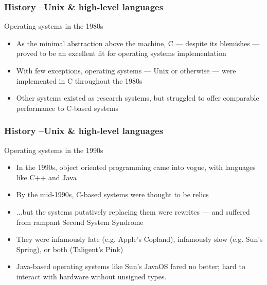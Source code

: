 \begin{frame}[plain]
	\frametitle{History --Unix \& high-level languages}
	
	Operating systems in the 1980s
	
	\begin{itemize}
		
		\item  As the minimal abstraction above the machine, C — despite its
		blemishes — proved to be an excellent fit for operating systems
		implementation
		
		\item With few exceptions, operating systems — Unix or otherwise —
		were implemented in C throughout the 1980s
		
		\item  Other systems existed as research systems, but struggled to
		offer comparable performance to C-based systems
		
		
		
	\end{itemize}
	
	
\end{frame}


\begin{frame}[plain]
	\frametitle{History --Unix \& high-level languages}
	
	Operating systems in the 1990s
	
	\begin{itemize}
		
		\item   In the 1990s, object oriented programming came into vogue,
		with languages like C++ and Java
		
		\item By the mid-1990s, C-based systems were thought to be relics
		
		\item ...but the systems putatively replacing them were rewrites —
		and suffered from rampant Second System Syndrome
		
		\item They were infamously late (e.g. Apple’s Copland), infamously
		slow (e.g. Sun’s Spring), or both (Taligent’s Pink)
		
		\item Java-based operating systems like Sun’s JavaOS fared no
		better; hard to interact with hardware without unsigned types.
		
	\end{itemize}
	
	
\end{frame}


